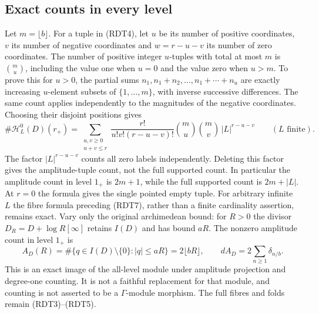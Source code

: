 \subsection{Exact counts in every level}
Let $m=\lfloor b\rfloor$. For a tuple in (RDT4), let $u$ be its
number of positive coordinates, $v$ its number of negative
coordinates and $w=r-u-v$ its number of zero coordinates. The number
of positive integer $u$-tuples with total at most $m$ is
$\binom m u$, including the value one when $u=0$ and the value zero
when $u>m$. To prove this for $u>0$, the partial sums
$n_1,n_1+n_2,\ldots,n_1+\cdots+n_u$ are exactly increasing
$u$-element subsets of $\{1,\ldots,m\}$, with inverse successive
differences. The same count applies independently to the magnitudes
of the negative coordinates. Choosing their disjoint positions gives
\begin{equation}\tag{RDT9}
\#\mathcal H_L^0(D)(r_+)
=\sum_{\substack{u,v\ge0\\u+v\le r}}
\frac{r!}{u!v!(r-u-v)!}
\binom m u\binom m v\,|L|^{r-u-v}
\qquad(L\text{ finite}).
\end{equation}
The factor $|L|^{r-u-v}$ counts all zero labels independently.
Deleting this factor gives the amplitude-tuple count, not the full
supported count. In particular the amplitude count in level $1_+$
is $2m+1$, while the full supported count is $2m+|L|$.
At $r=0$ the formula gives the single pointed empty tuple. For
arbitrary infinite $L$ the fibre formula preceding (RDT7), rather
than a finite cardinality assertion, remains exact.
Vary only the original archimedean bound: for $R>0$ the divisor
$D_R=D+\log R[\infty]$ retains $I(D)$ and has bound $aR$.
The nonzero amplitude count in level $1_+$ is
\begin{equation}\tag{RDT10}
A_D(R)=\#\{q\in I(D)\setminus\{0\}:|q|\le aR\}
=2\lfloor bR\rfloor,\qquad
dA_D=2\sum_{n\ge1}\delta_{n/b}.
\end{equation}
This is an exact image of the all-level module under amplitude
projection and degree-one counting. It is not a faithful replacement
for that module, and counting is not asserted to be a $\Gamma$-module
morphism. The full fibres and folds remain (RDT3)--(RDT5).
